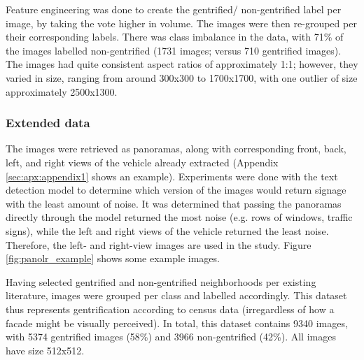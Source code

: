 Feature engineering was done to create the gentrified/ non-gentrified label per image, by taking the vote higher in volume. The images were then re-grouped per their corresponding labels. There was class imbalance in the data, with 71\% of the images labelled non-gentrified (1731 images; versus 710 gentrified images). The images had quite consistent aspect ratios of approximately 1:1; however, they varied in size, ranging from around 300x300 to 1700x1700, with one outlier of size approximately 2500x1300.


\subsubsection{Extended data}
The images were retrieved as panoramas, along with corresponding front, back, left, and right views of the vehicle already extracted (Appendix \ref{sec:apx:appendix1} shows an example). Experiments were done with the text detection model to determine which version of the images would return signage with the least amount of noise. It was determined that passing the panoramas directly through the model returned the most noise (e.g. rows of windows, traffic signs), while the left and right views of the vehicle returned the least noise. Therefore, the left- and right-view images are used in the study. Figure \ref{fig:panolr_example} shows some example images.

Having selected gentrified and non-gentrified neighborhoods per existing literature, images were grouped per class and labelled accordingly. This dataset thus represents gentrification according to census data (irregardless of how a facade might be visually perceived). In total, this dataset contains 9340 images, with 5374 gentrified images (58\%) and 3966 non-gentrified (42\%). All images have size 512x512.


